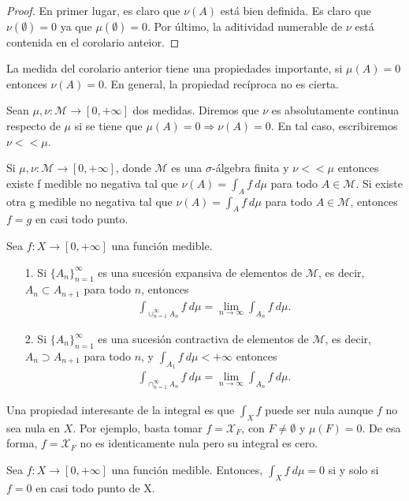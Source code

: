 \begin{proof}
    En primer lugar, es claro que $\nu(A)$ está bien definida. Es claro que $\nu(\emptyset) = 0$ ya que $\mu(\emptyset) = 0$. Por último, la aditividad numerable de $\nu$ está contenida en el corolario anteior.
\end{proof}

\begin{obs}
    La medida del corolario anterior tiene una propiedades importante, si $\mu(A) = 0$ entonces $\nu(A) = 0$. En general, la propiedad recíproca no es cierta.
\end{obs}
\begin{defi}
    Sean $\mu, \nu: \mathcal{M} \longrightarrow [0,+\infty]$ dos medidas. Diremos que $\nu$ es absolutamente continua respecto de $\mu$ si se tiene que $\mu(A) = 0 \Rightarrow \nu(A) = 0$. En tal caso, escribiremos $\nu << \mu$.
\end{defi}

\begin{teo}
    Si $\mu, \nu: \mathcal{M} \longrightarrow [0,+\infty]$, donde $\mathcal{M}$ es una $\sigma$-álgebra finita y $\nu << \mu$ entonces existe f medible no negativa tal que $\nu(A) = \int_{A}{f \ d\mu}$ para todo $A \in \mathcal{M}$. Si existe otra g medible no negativa tal que $\nu(A) = \int_{A}{f \ d\mu}$  para todo $A \in \mathcal{M}$, entonces $f = g$ en casi todo punto.
\end{teo}

\begin{obs}
    Sea $f: X \longrightarrow [0,+\infty]$ una función medible.
    \begin{enumerate}
        \item[1.] Si $\{A_n\}_{n=1}^{\infty}$ es una sucesión expansiva de elementos de $\mathcal{M}$, es decir, $A_n \subset A_{n+1}$ para todo $n$, entonces
              \begin{align*}
                  \int_{\cup_{n=1}^{\infty}{A_n}}{f \ d\mu} = \lim_{n \to \infty}{\int_{A_n}{f \ d\mu}}.
              \end{align*}
        \item[2.] Si $\{A_n\}_{n=1}^{\infty}$ es una sucesión contractiva de elementos de $\mathcal{M}$, es decir, $A_n \supset A_{n+1}$ para todo $n$, y $\int_{A_1}{f \ d\mu} < +\infty$ entonces
              \begin{align*}
                  \int_{\cap_{n=1}^{\infty}{A_n}}{f \ d\mu} = \lim_{n \to \infty}{\int_{A_n}{f \ d\mu}}.
              \end{align*}
    \end{enumerate}
\end{obs}
Una propiedad interesante de la integral es que $\int_{X}{f}$ puede ser nula aunque $f$ no sea nula en $X$. Por ejemplo, basta tomar $f = \mathcal{X}_F$, con $F \not = \emptyset$ y $\mu(F) = 0$. De esa forma, $f = \mathcal{X}_F$ no es identicamente nula pero su integral es cero.
\begin{prop}
    Sea $f: X \longrightarrow [0,+\infty]$ una función medible. Entonces, $\int_{X}{f \ d\mu} = 0$ si y solo si $f = 0$ en casi todo punto de X.
\end{prop}

